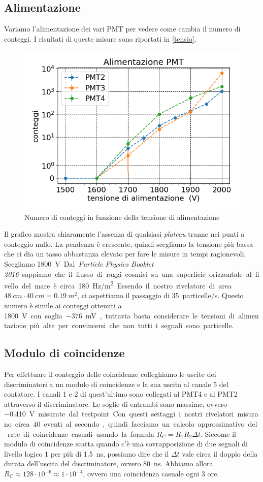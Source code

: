 \documentclass[a4paper]{article}
\begin{document}
\subsection*{Alimentazione}

Variamo l'alimentazione dei vari PMT per vedere come cambia il numero di conteggi. I risultati di queste misure sono  riportati in \autoref{tensio}. 

\begin{figure}[h]
\centering
\includegraphics[width=8 cm]{tensio_pmt}
\caption{Numero di conteggi in funzione della tensione di alimentazione}
\label{tensio}
\end{figure}

Il grafico mostra chiaramente l'assenza di qualsiasi \emph{plateau} tranne nei punti a conteggio nullo.
La pendenza è crescente, quindi scegliamo la tensione più bassa che ci dia un tasso abbastanza elevato
per fare le misure in tempi ragionevoli.
Scegliamo \SI{1800}V.

Dal \emph{Particle Physics Booklet 2016} sappiamo che il flusso di raggi cosmici su una superficie orizzontale al livello del mare è circa \SI{180}{Hz/m^2}.
Essendo il nostro rivelatore di area $\SI{48}{cm}\cdot\SI{40}{cm}=\SI{0.19}{m^2}$,
ci aspettiamo il passaggio di \SI{35}{particelle/s}.
Questo numero è simile ai conteggi ottenuti a \SI{1800}V con soglia \SI{-376}{mV},
tuttavia basta considerare le tensioni di alimentazione più alte per convincersi
che non tutti i segnali sono particelle.

\subsection*{Modulo di coincidenze}

Per effettuare il conteggio delle coincidenze colleghiamo le uscite dei discriminatori a un modulo di coincidenze e la sua uscita al canale 5 del contatore.
I canali 1 e 2 di quest'ultimo sono collegati al PMT4 e al PMT2 attraverso il discriminatore.
Le soglie di entrambi sono massime, ovvero \SI{-0.410}V misurate dal testpoint.
Con questi settaggi i nostri rivelatori misurano circa 40 eventi al secondo,
quindi facciamo un calcolo approssimativo del rate di coincidenze casuali usando la formula
$R_C=R_1R_2\Delta t$.
Siccome il modulo di coincidenze scatta quando c'è una sovrapposizione di due segnali di livello logico 1 per più di \SI{1.5}{ns},
possiamo dire che il $\Delta t$ vale circa il doppio della durata dell'uscita del discriminatore, ovvero \SI{80}{ns}.
Abbiamo allora $R_C\approx 128\cdot10^{-6}\approx1\cdot10^{-4}$,
ovvero una coincidenza casuale ogni 3 ore.
\end{document}
